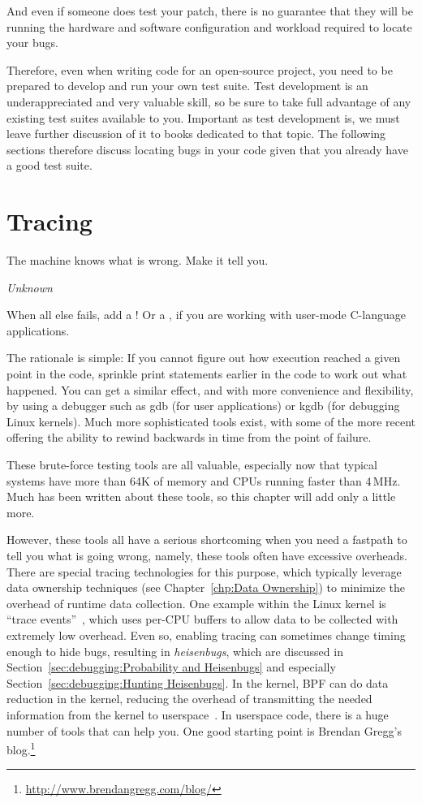 And even if someone does test your patch, there is no guarantee that they
will be running the hardware and software configuration and workload
required to locate your bugs.

Therefore, even when writing code for an open-source project, you need to
be prepared to develop and run your own test suite.
Test development is an underappreciated and very valuable skill, so be
sure to take full advantage of any existing test suites available to
you.
Important as test development is, we must leave further discussion of it
to books dedicated to that topic.
The following sections therefore discuss locating bugs in your code given that
you already have a good test suite.

\section{Tracing}
\label{sec:debugging:Tracing}
%
\epigraph{The machine knows what is wrong.  Make it tell you.}{\emph{Unknown}}

When all else fails, add a !
Or a , if you are working with user-mode C-language applications.

The rationale is simple: If you cannot figure out how execution reached
a given point in the code, sprinkle print statements earlier in the
code to work out what happened.
You can get a similar effect, and with more convenience and flexibility,
by using a debugger such as gdb (for user applications) or kgdb
(for debugging Linux kernels).
Much more sophisticated tools exist, with some of the more recent
offering the ability to rewind backwards in time from the point
of failure.

These brute-force testing tools are all valuable, especially now
that typical systems have more than 64K of memory and CPUs running
faster than 4\,MHz.
Much has been
written about these tools, so this chapter will add only a little more.

However, these tools all have a serious shortcoming when you need a
fastpath to tell you what is going wrong, namely, these tools often have
excessive overheads.
There are special tracing technologies for this purpose, which typically
leverage data ownership techniques
(see Chapter~\ref{chp:Data Ownership})
to minimize the overhead of runtime data collection.
One example within the Linux kernel is
``trace events''~\cite{StevenRostedt2010perfTraceEventP1,StevenRostedt2010perfTraceEventP2,StevenRostedt2010perfTraceEventP3,StevenRostedt2010perfHP+DeathlyMacros},
which uses per-CPU buffers to allow data to be collected with
extremely low overhead.
Even so, enabling tracing can sometimes change timing enough to
hide bugs, resulting in \emph{heisenbugs}, which are discussed in
Section~\ref{sec:debugging:Probability and Heisenbugs}
and especially Section~\ref{sec:debugging:Hunting Heisenbugs}.
In the kernel, BPF can do data reduction in the kernel, reducing
the overhead of transmitting the needed information from the kernel
to userspace~\cite{BrendanGregg2019BPFperftools}.
In userspace code, there is a huge number of tools that can help you.
One good starting point is Brendan Gregg's blog.\footnote{
	\url{http://www.brendangregg.com/blog/}}

